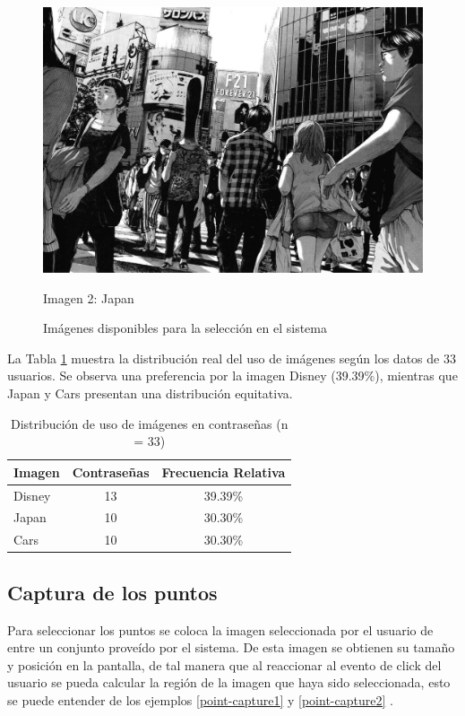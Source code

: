 \begin{figure}[ht]
	\hfill
		\begin{minipage}[b]{0.3\textwidth}
		\centering
		\includegraphics[width=\textwidth]{Graphics/japan.jpg}
		\caption*{Imagen 2: Japan}
	\end{minipage}
	
	\caption{Imágenes disponibles para la selección en el sistema}
	\label{fig:imagenes-sistema}
\end{figure}

La Tabla \ref{tab:uso-imagenes} muestra la distribución real del uso de imágenes según los datos de 33 usuarios. Se observa una preferencia por la imagen Disney (39.39\%), mientras que Japan y Cars presentan una distribución equitativa.


\begin{table}[ht]
	\centering
	\caption{Distribución de uso de imágenes en contraseñas (n = 33)}
	\label{tab:uso-imagenes}
	\begin{tabularx}{0.8\textwidth}{Xcc}
		\toprule
		\textbf{Imagen} & \textbf{Contraseñas} & \textbf{Frecuencia Relativa} \\
		\midrule
		Disney & 13 & 39.39\% \\
		Japan & 10 & 30.30\% \\
		Cars & 10 & 30.30\% \\
		\bottomrule
	\end{tabularx}
	\vspace{0.2cm}

\end{table}



\subsection{Captura de los puntos}
Para seleccionar los puntos se coloca la imagen seleccionada por el usuario de entre un conjunto prove\'ido por el sistema. De esta imagen se obtienen su tama\~no y posici\'on en la pantalla, de tal manera que al reaccionar al evento de click del usuario se pueda calcular la regi\'on de la imagen que haya sido seleccionada, esto se puede entender de los ejemplos \ref{point-capture1} y \ref{point-capture2} . \\\\

